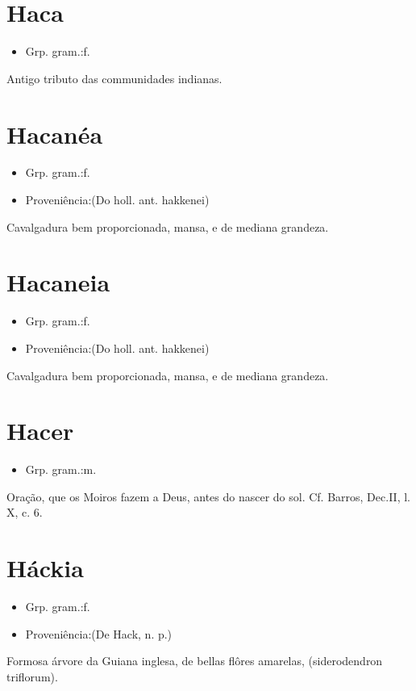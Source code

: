 \documentclass{article}
\begin{document}
\section{Haca}
\begin{itemize}
\item {Grp. gram.:f.}
\end{itemize}
Antigo tributo das communidades indianas.
\section{Hacanéa}
\begin{itemize}
\item {Grp. gram.:f.}
\end{itemize}
\begin{itemize}
\item {Proveniência:(Do holl. ant. \textunderscore hakkenei\textunderscore )}
\end{itemize}
Cavalgadura bem proporcionada, mansa, e de mediana grandeza.
\section{Hacaneia}
\begin{itemize}
\item {Grp. gram.:f.}
\end{itemize}
\begin{itemize}
\item {Proveniência:(Do holl. ant. \textunderscore hakkenei\textunderscore )}
\end{itemize}
Cavalgadura bem proporcionada, mansa, e de mediana grandeza.
\section{Hacer}
\begin{itemize}
\item {Grp. gram.:m.}
\end{itemize}
Oração, que os Moiros fazem a Deus, antes do nascer do sol. Cf. Barros, \textunderscore Dec.\textunderscore  II, l. X, c. 6.
\section{Háckia}
\begin{itemize}
\item {Grp. gram.:f.}
\end{itemize}
\begin{itemize}
\item {Proveniência:(De \textunderscore Hack\textunderscore , n. p.)}
\end{itemize}
Formosa árvore da Guiana inglesa, de bellas flôres amarelas, (\textunderscore siderodendron triflorum\textunderscore ).
\end{document}
